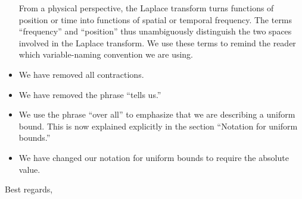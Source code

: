 \documentclass{letter}
\begin{document}
\begin{letter}{}
\begin{itemize}
From a physical perspective, the Laplace transform turns functions of position or time into functions of spatial or temporal frequency. The terms ``frequency'' and ``position'' thus unambiguously distinguish the two spaces involved in the Laplace transform. We use these terms to remind the reader which variable-naming convention we are using.
\item We have removed all contractions.
\item We have removed the phrase ``tells us.''
\item We use the phrase ``over all'' to emphasize that we are describing a uniform bound. This is now explained explicitly in the section ``Notation for uniform bounds.''
\item We have changed our notation for uniform bounds to require the absolute value.
\end{itemize}
\color{black}
\closing{Best regards,}
\end{letter}
\end{document}
